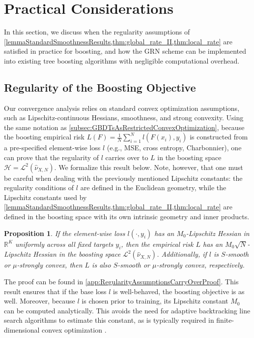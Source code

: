 \documentclass{article}
\theoremstyle{plain}
\newtheorem{proposition}[theorem]{Proposition}
\theoremstyle{definition}
\theoremstyle{remark}
\begin{document}
\section{Practical Considerations}

In this section, we discuss when the regularity assumptions of \cref{lemmaStandardSmoothnessResults,thm:global_rate_II,thm:local_rate} are satisfied in practice for boosting, and how the GRN scheme can be implemented into existing tree boosting algorithms with negligible computational overhead.

\subsection{Regularity of the Boosting Objective}

Our convergence analysis relies on standard convex optimization assumptions, such as Lipschitz-continuous Hessians, smoothness, and strong convexity. Using the same notation as \cref{subsec:GBDTsAsRestrictedConvexOptimization}, because the boosting empirical risk $L(F) = \frac{1}{N} \sum_{i=1}^N l(F(x_i), y_i)$ is constructed from a pre-specified element-wise loss $l$ (e.g., MSE, cross entropy, Charbonnier), one can prove that the regularity of $l$ carries over to $L$ in the boosting space $\mathcal{H} = \mathcal{L}^2(\widehat{\nu}_{X,N})$. We formalize this result below. Note, however, that one must be careful when dealing with the previously mentioned Lipschitz constants: the regularity conditions of $l$ are defined in the Euclidean geometry, while the Lipschitz constants used by \cref{lemmaStandardSmoothnessResults,thm:global_rate_II,thm:local_rate} are defined in the boosting space with its own intrinsic geometry and inner products. 

\vspace{5pt}
\begin{proposition}\label{prop:regularity}
    If the element-wise loss $l(\cdot, y_i)$ has an $M_0$-Lipschitz Hessian in $\mathbb{R}^K$ uniformly across all fixed targets $y_i$, then the empirical risk $L$ has an $M_0\sqrt{N}$-Lipschitz Hessian in the boosting space $\mathcal{L}^2(\widehat{\nu}_{X,N})$. Additionally, if $l$ is $S$-smooth or $\mu$-strongly convex, then $L$ is also $S$-smooth or $\mu$-strongly convex, respectively.
\end{proposition}

The proof can be found in \cref{app:RegularityAssumptionsCarryOverProof}. This result ensures that if the base loss $l$ is well-behaved, the boosting objective is as well. Moreover, because $l$ is chosen prior to training, its Lipschitz constant $M_0$ can be computed analytically. This avoids the need for adaptive backtracking line search algorithms to estimate this constant, as is typically required in finite-dimensional convex optimization \cite{2022ADampedNewtonMethodAchievesGlobalMinus2AndLocalQuadraticConvergenceRate,2023RegularizedNewtonMethodWithGlobalConvergence,2025OPTAMI}.
\end{document}
